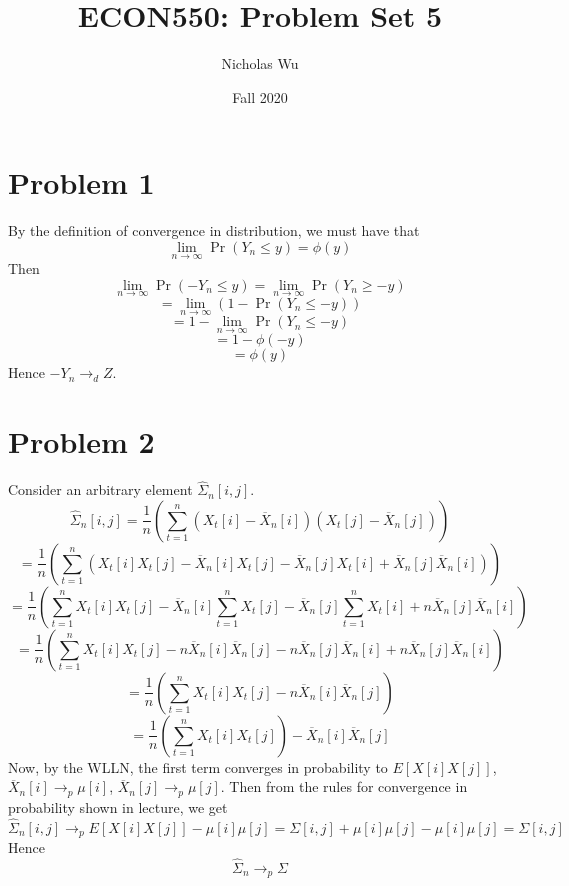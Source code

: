 \documentclass[10pt,letter]{article}
\begin{document}


\title{ECON550: Problem Set 5}

\author{Nicholas Wu}

\date{Fall 2020}

\maketitle
\section*{Problem 1}
By the definition of convergence in distribution, we must have that
\[ \lim_{n \to \infty} \Pr (Y_n \le y) = \phi(y) \]
Then
\[ \lim_{n \to \infty} \Pr (-Y_n \le y) = \lim_{n \to \infty} \Pr (Y_n \ge -y) \]
\[ = \lim_{n \to \infty} \left( 1 - \Pr (Y_n \le -y) \right)  \]
\[ = 1 - \lim_{n \to \infty}  \Pr (Y_n \le -y)   \]
\[  = 1 - \phi(-y) \]
\[  = \phi(y) \]
Hence $-Y_n \to_d Z$.
\section*{Problem 2}
Consider an arbitrary element $\hat{\Sigma}_n[i,j]$.
\[ \hat{\Sigma}_n[i,j] = \frac{1}{n}\left( \sum_{t=1}^n (X_t[i] - \overline{X}_n[i])(X_t[j] - \overline{X}_n[j]) \right)\]
\[ = \frac{1}{n}\left( \sum_{t=1}^n (X_t[i]X_t[j] - \overline{X}_n[i]X_t[j]- \overline{X}_n[j]X_t[i] + \overline{X}_n[j]\overline{X}_n[i]) \right) \]
\[ = \frac{1}{n}\left( \sum_{t=1}^n X_t[i]X_t[j] - \overline{X}_n[i]\sum_{t=1}^n X_t[j]- \overline{X}_n[j]\sum_{t=1}^n X_t[i] + n \overline{X}_n[j]\overline{X}_n[i] \right) \]
\[ = \frac{1}{n}\left( \sum_{t=1}^n X_t[i]X_t[j] - n\overline{X}_n[i]\overline{X}_n[j]- n\overline{X}_n[j]\overline{X}_n[i] + n \overline{X}_n[j]\overline{X}_n[i] \right) \]
\[ = \frac{1}{n}\left( \sum_{t=1}^n X_t[i]X_t[j] - n\overline{X}_n[i]\overline{X}_n[j] \right) \]
\[ = \frac{1}{n}\left( \sum_{t=1}^n X_t[i]X_t[j]\right) - \overline{X}_n[i]\overline{X}_n[j]  \]
Now, by the WLLN, the first term converges in probability to $E[X[i]X[j]]$, $\overline{X}_n[i] \to_p \mu[i]$, $\overline{X}_n[j] \to_p \mu[j]$. Then from the rules for convergence in probability shown in lecture, we get
\[ \hat{\Sigma}_n[i,j] \to_p E[X[i]X[j]] - \mu[i]\mu[j]  = \Sigma[i,j] + \mu[i]\mu[j] - \mu[i]\mu[j]= \Sigma[i,j] \]
Hence
\[ \hat{\Sigma}_n \to_p \Sigma\]
\end{document}

